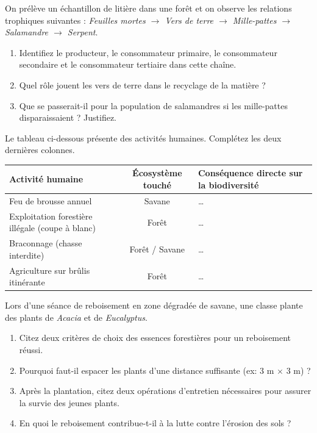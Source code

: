 \documentclass[11pt]{article}
\begin{document}
\begin{exercice}
On prélève un échantillon de litière dans une forêt et on observe les relations trophiques suivantes : \textit{Feuilles mortes $\to$ Vers de terre $\to$ Mille-pattes $\to$ Salamandre $\to$ Serpent}.
\begin{enumerate}
    \item Identifiez le producteur, le consommateur primaire, le consommateur secondaire et le consommateur tertiaire dans cette chaîne.
    \item Quel rôle jouent les vers de terre dans le recyclage de la matière ?
    \item Que se passerait-il pour la population de salamandres si les mille-pattes disparaissaient ? Justifiez.
\end{enumerate}
\end{exercice}

\begin{exercice}
Le tableau ci-dessous présente des activités humaines. Complétez les deux dernières colonnes.
\begin{center}
\begin{tabularx}{\linewidth}{|X|c|X|}
\hline
\textbf{Activité humaine} & \textbf{Écosystème touché} & \textbf{Conséquence directe sur la biodiversité} \\
\hline
Feu de brousse annuel & Savane & \ldots \\
\hline
Exploitation forestière illégale (coupe à blanc) & Forêt & \ldots \\
\hline
Braconnage (chasse interdite) & Forêt / Savane & \ldots \\
\hline
Agriculture sur brûlis itinérante & Forêt & \ldots \\
\hline
\end{tabularx}
\end{center}
\end{exercice}

\begin{exercice}
Lors d'une séance de reboisement en zone dégradée de savane, une classe plante des plants de \textit{Acacia} et de \textit{Eucalyptus}.
\begin{enumerate}
    \item Citez deux critères de choix des essences forestières pour un reboisement réussi.
    \item Pourquoi faut-il espacer les plants d'une distance suffisante (ex: 3 m $\times$ 3 m) ?
    \item Après la plantation, citez deux opérations d'entretien nécessaires pour assurer la survie des jeunes plants.
    \item En quoi le reboisement contribue-t-il à la lutte contre l'érosion des sols ?
\end{enumerate}
\end{exercice}
\end{document}
